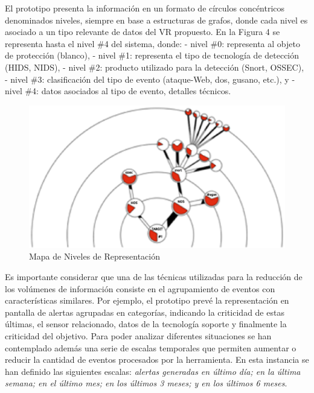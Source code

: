 \documentclass[a4paper]{./plantillas/llncs}
\begin{document}
El prototipo presenta la información en un formato de círculos concéntricos denominados niveles, siempre en base a estructuras de grafos, donde cada nivel es asociado a un tipo relevante de datos del VR propuesto. En la Figura 4 se representa hasta el nivel \#4 del sistema, donde: \newline
- nivel \#0: representa al objeto de protección (blanco), \newline
- nivel \#1: representa el tipo de tecnología de detección (HIDS, NIDS), \newline
- nivel \#2: producto utilizado para la detección (Snort, OSSEC), \newline
- nivel \#3: clasificación del tipo de evento (ataque-Web, dos, gusano, etc.), y \newline
- nivel \#4: datos asociados al tipo de evento, detalles técnicos. \newline

\begin{figure}
\centering
\includegraphics[scale=0.55]{./img/1-mp3}
\caption{Mapa de Niveles de Representación}
\end{figure}



Es importante considerar que una de las técnicas utilizadas para la reducción de los volúmenes de información consiste en el agrupamiento de eventos con características similares. Por ejemplo, el prototipo prevé la representación en pantalla de alertas agrupadas en categorías, indicando la criticidad de estas últimas, el sensor relacionado, datos de la tecnología soporte y finalmente la criticidad del objetivo. Para poder analizar diferentes situaciones se han contemplado además una serie de escalas temporales que permiten aumentar o reducir la cantidad de eventos procesados por la herramienta. En esta instancia se han definido las siguientes escalas: {\itshape alertas generadas en último día; en la última semana; en el último mes; en los últimos 3 meses; y en los últimos 6 meses}.
\end{document}
